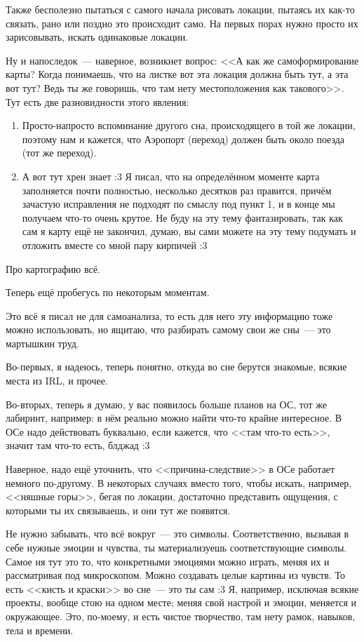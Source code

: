 \documentclass[a4paper,14pt,oneside]{memoir}
\begin{document}
Также бесполезно пытаться с самого начала рисовать локации, пытаясь их как-то связать, рано или поздно это происходит само. На первых порах нужно просто их зарисовывать, искать одинаковые локации.
 
Ну и напоследок~--- наверное, возникнет вопрос: <<А как же самоформирование карты? Когда понимаешь, что на листке вот эта локация должна быть тут, а эта вот тут? Ведь ты же говоришь, что там нету местоположения как такового>>. 
Тут есть две разновидности этого явления:
\begin{enumerate}
\item Просто-напросто вспоминание другого сна, происходящего в той же локации, поэтому нам и кажется, что Аэропорт (переход) должен быть около поезда (тот же переход). 
\item А вот тут хрен знает :3 Я писал, что на определённом моменте карта заполняется почти полностью, несколько десятков раз правится, причём зачастую исправления не подходят по смыслу под пункт 1, и в конце мы получаем что-то очень крутое. Не буду на эту тему фантазировать, так как сам я карту ещё не закончил, думаю, вы сами можете на эту тему подумать и отложить вместе со мной пару кирпичей :3 
\end{enumerate}

Про картографию всё.

Теперь ещё пробегусь по некоторым моментам.
 
Это всё я писал не для самоанализа, то есть для него эту информацию тоже можно использовать, но ящитаю, что разбирать самому свои же сны~--- это мартышкин труд. 

Во-первых, я надеюсь, теперь понятно, откуда во сне берутся знакомые, всякие места из IRL, и прочее.

Во-вторых, теперь я думаю, у вас появилось больше планов на ОС, тот же лабиринт, например: в нём реально можно найти что-то крайне интересное. В ОСе надо действовать буквально, если кажется, что <<там что-то есть>>, значит там что-то есть, блджад :3 

Наверное, надо ещё уточнить, что <<причина-следствие>> в ОСе работает немного по-другому. В некоторых случаях вместо того, чтобы искать, например, <<няшные горы>>, бегая по локации, достаточно представить ощущения, с которыми ты их связываешь, и они тут же появятся.
 
Не нужно забывать, что всё вокруг~--- это символы. Соответственно, вызывая в себе нужные эмоции и чувства, ты материализуешь соответствующие символы. Самое ня тут это то, что конкретными эмоциями можно играть, меняя их и рассматривая под микроскопом. Можно создавать целые картины из чувств. То есть <<кисть и краски>> во сне~--- это ты сам :3 Я, например, исключая всякие проекты, вообще стою на одном месте; меняя свой настрой и эмоции, меняется и окружающее. Это, по-моему, и есть чистое творчество, там нету рамок, навыков, тела и времени.
 
\end{document}
